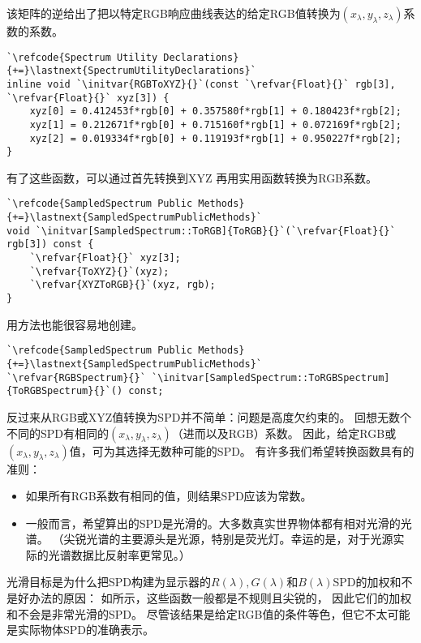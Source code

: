 该矩阵的逆给出了把以特定RGB响应曲线表达的给定RGB值转换为$(x_{\lambda},y_{\lambda},z_{\lambda})$系数的系数。
\begin{lstlisting}
`\refcode{Spectrum Utility Declarations}{+=}\lastnext{SpectrumUtilityDeclarations}`
inline void `\initvar{RGBToXYZ}{}`(const `\refvar{Float}{}` rgb[3], `\refvar{Float}{}` xyz[3]) {
    xyz[0] = 0.412453f*rgb[0] + 0.357580f*rgb[1] + 0.180423f*rgb[2];
    xyz[1] = 0.212671f*rgb[0] + 0.715160f*rgb[1] + 0.072169f*rgb[2];
    xyz[2] = 0.019334f*rgb[0] + 0.119193f*rgb[1] + 0.950227f*rgb[2];
}
\end{lstlisting}

有了这些函数，可以通过首先转换到XYZ
再用实用函数转换为RGB系数。
\begin{lstlisting}
`\refcode{SampledSpectrum Public Methods}{+=}\lastnext{SampledSpectrumPublicMethods}`
void `\initvar[SampledSpectrum::ToRGB]{ToRGB}{}`(`\refvar{Float}{}` rgb[3]) const { 
    `\refvar{Float}{}` xyz[3];
    `\refvar{ToXYZ}{}`(xyz);
    `\refvar{XYZToRGB}{}`(xyz, rgb);
}
\end{lstlisting}

用方法也能很容易地创建。
\begin{lstlisting}
`\refcode{SampledSpectrum Public Methods}{+=}\lastnext{SampledSpectrumPublicMethods}`
`\refvar{RGBSpectrum}{}` `\initvar[SampledSpectrum::ToRGBSpectrum]{ToRGBSpectrum}{}`() const;
\end{lstlisting}

反过来从RGB或XYZ值转换为SPD并不简单：问题是高度欠约束的。
回想无数个不同的SPD有相同的$(x_{\lambda},y_{\lambda},z_{\lambda})$（进而以及RGB）系数。
因此，给定RGB或$(x_{\lambda},y_{\lambda},z_{\lambda})$值，可为其选择无数种可能的SPD。
有许多我们希望转换函数具有的准则：
\begin{itemize}
    \item 如果所有RGB系数有相同的值，则结果SPD应该为常数。
    \item 一般而言，希望算出的SPD是光滑的。大多数真实世界物体都有相对光滑的光谱。
          （尖锐光谱的主要源头是光源，特别是荧光灯。幸运的是，对于光源实际的光谱数据比反射率更常见。）
\end{itemize}

光滑目标是为什么把SPD构建为显示器的$R(\lambda),G(\lambda)$和$B(\lambda)$SPD的加权和不是好办法的原因：
如所示，这些函数一般都是不规则且尖锐的，
因此它们的加权和不会是非常光滑的SPD。
尽管该结果是给定RGB值的条件等色，但它不太可能是实际物体SPD的准确表示。

